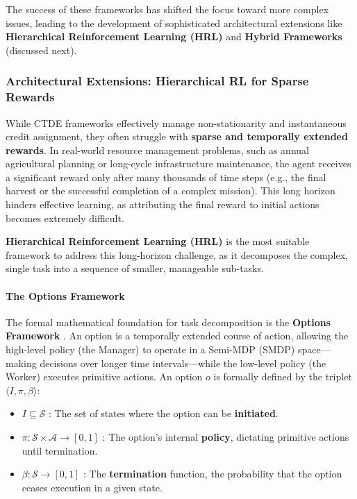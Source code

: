 \documentclass[conference]{IEEEtran}
\begin{document}
The success of these frameworks has shifted the focus toward more complex issues, leading to the development of sophisticated architectural extensions like \textbf{Hierarchical Reinforcement Learning (HRL)} and \textbf{Hybrid Frameworks} (discussed next).

\subsubsection{Architectural Extensions: Hierarchical RL for Sparse Rewards}

While CTDE frameworks effectively manage non-stationarity and instantaneous credit assignment, they often struggle with \textbf{sparse and temporally extended rewards}. In real-world resource management problems, such as annual agricultural planning or long-cycle infrastructure maintenance, the agent receives a significant reward only after many thousands of time steps (e.g., the final harvest or the successful completion of a complex mission). This long horizon hinders effective learning, as attributing the final reward to initial actions becomes extremely difficult.

\textbf{Hierarchical Reinforcement Learning (HRL)} is the most suitable framework to address this long-horizon challenge, as it decomposes the complex, single task into a sequence of smaller, manageable sub-tasks.

\paragraph{The Options Framework}

The formal mathematical foundation for task decomposition is the \textbf{Options Framework} \cite{suttonMDPsSemiMDPsFramework1999}. An option is a temporally extended course of action, allowing the high-level policy (the Manager) to operate in a Semi-MDP (SMDP) space—making decisions over longer time intervals—while the low-level policy (the Worker) executes primitive actions. An option $o$ is formally defined by the triplet $\langle I, \pi, \beta \rangle$:
\begin{itemize}
    \item $I \subseteq \mathcal{S}$ : The set of states where the option can be \textbf{initiated}.
    \item $\pi : \mathcal{S} \times \mathcal{A} \to [0, 1]$ : The option's internal \textbf{policy}, dictating primitive actions until termination.
    \item $\beta : \mathcal{S} \to [0, 1]$ : The \textbf{termination} function, the probability that the option ceases execution in a given state.
\end{itemize}
\end{document}
